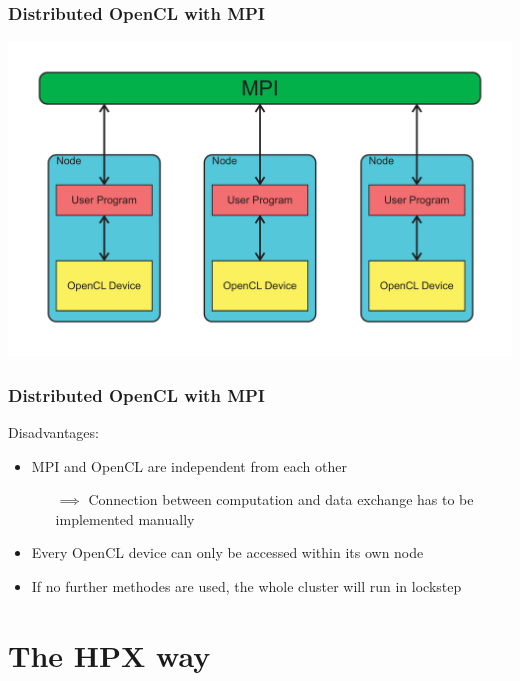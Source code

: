 \documentclass{beamer}
\begin{document}
\begin{frame}
    \frametitle{Distributed OpenCL with MPI}
    \includegraphics[width=\textwidth]{../2014-09-25_gputalk/mpi_opencl.pdf}
\end{frame}

\begin{frame}
    \frametitle{Distributed OpenCL with MPI}
    Disadvantages:
    \begin{itemize}
        \item MPI and OpenCL are independent from each other
        \begin{itemize}
            \item[$\implies$] Connection between computation and data exchange
                              has to be implemented manually
        \end{itemize}
        \item Every OpenCL device can only be accessed within its own node
        \item If no further methodes are used, the whole cluster will run in lockstep
    \end{itemize}
\end{frame}


\section{The HPX way}
\end{document}
